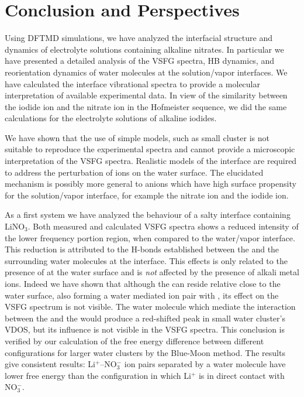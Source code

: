 \chapter{Conclusion and Perspectives}\label{CHAPTER_Summary}
Using DFTMD simulations, we have analyzed the interfacial structure and dynamics of electrolyte solutions containing alkaline nitrates.
In particular we have presented a detailed analysis of the VSFG spectra, HB dynamics, and reorientation dynamics of water molecules at the solution/vapor interfaces. 
We have calculated the interface vibrational spectra to provide a molecular interpretation of available experimental data. 
In view of the similarity between the iodide ion and the nitrate ion in the Hofmeister sequence, 
we did the same calculations for the electrolyte solutions of alkaline iodides. 

We have shown that the use of simple models, such as small cluster is not suitable to reproduce the experimental spectra 
and cannot provide a microscopic interpretation of the VSFG spectra. Realistic models of the interface are required to address the 
perturbation of ions on the water surface. The elucidated mechanism is possibly more general to anions which have high 
surface propensity for the solution/vapor interface, for example the nitrate ion and the iodide ion.

As a first system we have analyzed the behaviour of a salty interface containing LiNO$_3$.
Both measured and calculated VSFG spectra shows a reduced intensity of the lower frequency portion region, 
when compared to the water/vapor interface. 
This reduction is attributed to the H-bonds established between the \nitrate and the surrounding water molecules at the interface.
This effects is only related to the presence of \nitrate at the water surface and is \emph{not} affected by the presence of alkali metal ions.
Indeed we have shown that although the \Li can reside relative close to the water surface, also forming a water mediated
ion pair with \nit, its effect on the VSFG spectrum is not visible. The water molecule which mediate the interaction 
between the \nitrate and the \Li would produce a red-shifted peak in small water cluster's VDOS, but its influence is not visible 
in the VSFG spectra. This conclusion is verified by our calculation of the free energy difference between different configurations for 
larger water clusters by the Blue-Moon method. The results give consistent results: Li$^+$--NO$_3^-$ ion pairs 
separated by a water molecule have lower free energy than the configuration in which Li$^+$ is in direct contact with NO$_3^-$. 

